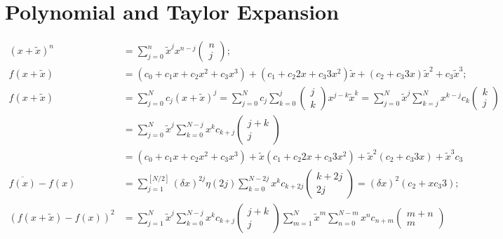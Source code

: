 \documentclass[twoside]{article}
\numberwithin{equation}{section}
\begin{document}
\clearpage
\section{Polynomial and Taylor Expansion}
\label{sec: polynomial}

\iffalse

\begin{align*}
(x + \tilde{x})^n &= \sum_{j=0}^{n} \tilde{x}^j x^{n - j}  \begin{pmatrix} n \\ j \end{pmatrix}; \\
f(x + \tilde{x}) &= ( c_0 + c_1 x + c_2 x^2 + c_3 x^3 )  + ( c_1 + c_2 2 x + c_3 3 x^2 ) \tilde{x} +  ( c_2 + c_3 3 x ) \tilde{x}^2 
   + c_3 \tilde{x}^3; \\
f(x + \tilde{x}) &= \sum_{j=0}^{N} c_j (x + \tilde{x})^j 
     = \sum_{j=0}^{N} c_j  \sum_{k=0}^{j} \begin{pmatrix} j \\ k \end{pmatrix} x^{j-k}  \tilde{x}^k
     = \sum_{j=0}^{N} \tilde{x}^{j} \sum_{k=j}^{N} x^{k - j} c_k \begin{pmatrix} k \\ j \end{pmatrix} \\
 & = \sum_{j=0}^{N} \tilde{x}^{j} \sum_{k=0}^{N - j} x^{k} c_{k + j} \begin{pmatrix} j + k \\ j \end{pmatrix} \\   
 &= ( c_0 + c_1 x + c_2 x^2 + c_3 x^3 ) + \tilde{x} (c_1 + c_2 2 x + c_3 3 x^2 ) + \tilde{x}^2 ( c_2 + c_3 3 x ) + \tilde{x}^3 c_3 \\
\overline{f(x)} - f(x) &= \sum_{j=1}^{[N/2]} (\delta x)^{2j} \eta(2j) \sum_{k=0}^{N - 2j} x^{k} c_{k + 2j} \begin{pmatrix} k + 2j \\ 2j \end{pmatrix}
  = (\delta x)^2 ( c_2  + x c_3 3 ); \\
(f(x + \tilde{x}) - f(x))^2 &=
 \sum_{j=1}^{N} \tilde{x}^{j} \sum_{k=0}^{N-j} x^{k} c_{k + j} \begin{pmatrix} j + k \\ j \end{pmatrix} 
 \sum_{m=1}^{N} \tilde{x}^{m} \sum_{n=0}^{N-m} x^{n} c_{n + m} \begin{pmatrix} m + n \\ m \end{pmatrix} \\

\end{align*}
\end{document}
